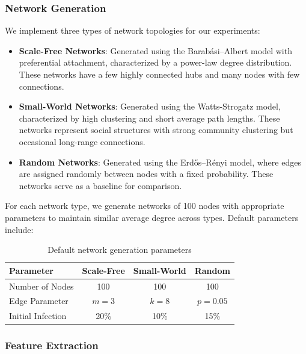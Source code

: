 \documentclass[12pt]{article}
\begin{document}
\subsubsection{Network Generation}

We implement three types of network topologies for our experiments:

\begin{itemize}
    \item \textbf{Scale-Free Networks}: Generated using the Barabási–Albert model with preferential attachment, characterized by a power-law degree distribution. These networks have a few highly connected hubs and many nodes with few connections.
    
    \item \textbf{Small-World Networks}: Generated using the Watts-Strogatz model, characterized by high clustering and short average path lengths. These networks represent social structures with strong community clustering but occasional long-range connections.
    
    \item \textbf{Random Networks}: Generated using the Erdős–Rényi model, where edges are assigned randomly between nodes with a fixed probability. These networks serve as a baseline for comparison.
\end{itemize}

For each network type, we generate networks of 100 nodes with appropriate parameters to maintain similar average degree across types. Default parameters include:

\begin{table}[h]
\centering
\begin{tabular}{@{}lccc@{}}
\toprule
\textbf{Parameter} & \textbf{Scale-Free} & \textbf{Small-World} & \textbf{Random} \\
\midrule
Number of Nodes & 100 & 100 & 100 \\
Edge Parameter & $m=3$ & $k=8$ & $p=0.05$ \\
Initial Infection & 20\% & 10\% & 15\% \\
\bottomrule
\end{tabular}
\caption{Default network generation parameters}
\label{tab:network_params}
\end{table}

\subsubsection{Feature Extraction}
\end{document}
